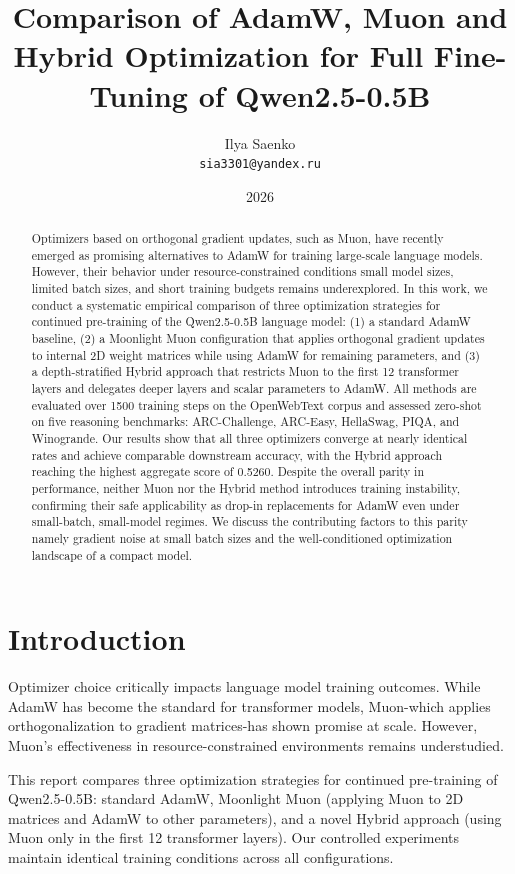 \documentclass[11pt,a4paper]{article}
\title{Comparison of AdamW, Muon and Hybrid Optimization for Full Fine-Tuning of Qwen2.5-0.5B}
\date{2026}
\author{Ilya Saenko\\
    \texttt{sia3301@yandex.ru}}
\begin{document}
\maketitle

\begin{abstract}
	Optimizers based on orthogonal gradient updates, such as Muon, have recently
	emerged as promising alternatives to AdamW for training large-scale language
	models. However, their behavior under resource-constrained conditions small
	model sizes, limited batch sizes, and short training budgets remains
	underexplored. In this work, we conduct a systematic empirical comparison of
	three optimization strategies for continued pre-training of the Qwen2.5-0.5B
	language model: (1) a standard AdamW baseline, (2) a Moonlight Muon
	configuration that applies orthogonal gradient updates to internal 2D weight
	matrices while using AdamW for remaining parameters, and (3) a depth-stratified
	Hybrid approach that restricts Muon to the first 12 transformer layers and
	delegates deeper layers and scalar parameters to AdamW. All methods are
	evaluated over 1500 training steps on the OpenWebText corpus and assessed
	zero-shot on five reasoning benchmarks: ARC-Challenge, ARC-Easy, HellaSwag,
	PIQA, and Winogrande. Our results show that all three optimizers converge at
	nearly identical rates and achieve comparable downstream accuracy, with the
	Hybrid approach reaching the highest aggregate score of 0.5260. Despite the
	overall parity in performance, neither Muon nor the Hybrid method introduces
	training instability, confirming their safe applicability as drop-in replacements
	for AdamW even under small-batch, small-model regimes. We discuss the
	contributing factors to this parity namely gradient noise at small batch sizes
	and the well-conditioned optimization landscape of a compact model.
\end{abstract}

\section{Introduction}

Optimizer choice critically impacts language model training outcomes.
While AdamW has become the standard for transformer models, Muon-which
applies orthogonalization to gradient matrices-has shown promise at scale.
However, Muon's effectiveness in resource-constrained environments remains
understudied.

This report compares three optimization strategies for continued pre-training
of Qwen2.5-0.5B: standard AdamW, Moonlight Muon (applying Muon to 2D matrices
and AdamW to other parameters), and a novel Hybrid approach (using Muon only
in the first 12 transformer layers). Our controlled experiments maintain
identical training conditions across all configurations.
\end{document}
